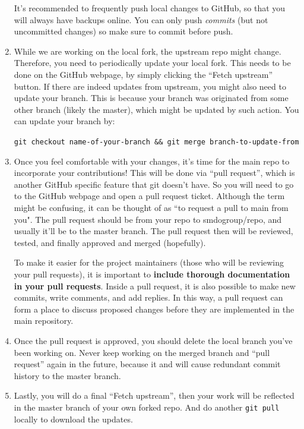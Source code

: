 \documentclass[11pt]{article}
\begin{document}
\begin{enumerate}
    It's recommended to frequently push local changes to GitHub, so that you will always have backups online.
    You can only push \emph{commits} (but not uncommitted changes) so make sure to commit before push.
    
    \item While we are working on the local fork, the upstream repo might change. Therefore, you need to periodically update your local fork.
    This needs to be done on the GitHub webpage, by simply clicking the ``Fetch upstream'' button.
    If there are indeed updates from upstream, you might also need to update your branch.
    This is because your branch was originated from some other branch (likely the master),
    which might be updated by such action.
    You can update your branch by:

    \texttt{git checkout name-of-your-branch \&\& git merge branch-to-update-from}
    
    \item
    Once you feel comfortable with your changes, it's time for the main repo to incorporate your
    contributions!
    This will be done via ``pull request'', which is another GitHub specific feature that git doesn't
    have. So you will need to go to the GitHub webpage and open a pull request ticket. Although the term might be confusing, it can be thought of as ``to request a pull to main from you".
    The pull request should be from your repo to smdogroup/repo, and usually it'll be to the master branch.
    The pull request then will be reviewed, tested, and finally approved and merged (hopefully).
    
    To make it easier for the project maintainers (those who will be reviewing your pull requests), it is important to \textbf{include thorough documentation in your pull requests}. Inside a pull request, it is also possible to make new commits, write comments, and add replies. In this way, a pull request can form a place to discuss proposed changes before they are implemented in the main repository.

    \item
    Once the pull request is approved, you should delete the local branch you've been working on.
    Never keep working on the merged branch and ``pull request'' again in the future,
    because it and will cause redundant commit history to the master branch.

    \item
    Lastly, you will do a final ``Fetch upstream'', then your work will be reflected in the master
    branch of your own forked repo.
    And do another \texttt{git pull} locally to download the updates.

\end{enumerate}
\end{document}
